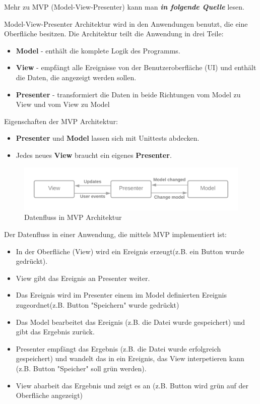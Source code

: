Mehr zu MVP (Model-View-Presenter) kann man \textit{\textbf{in folgende Quelle}} lesen.

Model-View-Presenter Architektur wird in den Anwendungen benutzt, die eine Oberfläche besitzen.
Die Architektur teilt die Anwendung in drei Teile:
\begin{itemize}
    \item \textbf{Model} - enthält die komplete Logik des Programms.
    \item \textbf{View} - empfängt alle Ereignisse von der Benutzeroberfläche (UI) und enthält die Daten, die angezeigt werden sollen.
    \item \textbf{Presenter} - transformiert die Daten in beide Richtungen vom Model zu View 
    und vom View zu Model
\end{itemize}


Eigenschaften der MVP Architektur:
\begin{itemize}
    \item \textbf{Presenter} und \textbf{Model} lassen sich mit Unittests abdecken.
    \item Jedes neues \textbf{View} braucht ein eigenes \textbf{Presenter}.
\end{itemize}

\begin{figure}[H]
    \centering
    \includegraphics[width=1\textwidth]{./images/MVP.png}
    \caption[Datenfluss in MVP Architektur]{Datenfluss in MVP Architektur \footnotemark}
    \label{fig:MVP}
\end{figure}

Der Datenfluss in einer Anwendung, die mittels MVP implementiert ist:
\begin{itemize}
    \item In der Oberfläche (View) wird ein Ereignis erzeugt(z.B. ein Button wurde gedrückt).
    \item View gibt das Ereignis an Presenter weiter.
    \item Das Ereignis wird im Presenter einem im Model definierten Ereignis zugeordnet(z.B. Button "Speichern" wurde gedrückt)
    \item Das Model bearbeitet das Ereignis (z.B. die Datei wurde gespeichert) und gibt das Ergebnis zurück.
    \item Presenter empfängt das Ergebnis (z.B. die Datei wurde erfolgreich gespeichert) und wandelt das in ein Ereignis,
    das View interpetieren kann (z.B. Button "Speicher" soll grün werden).
    \item View abarbeit das Ergebnis und zeigt es an (z.B. Button wird grün auf der Oberfläche angezeigt)
\end{itemize}